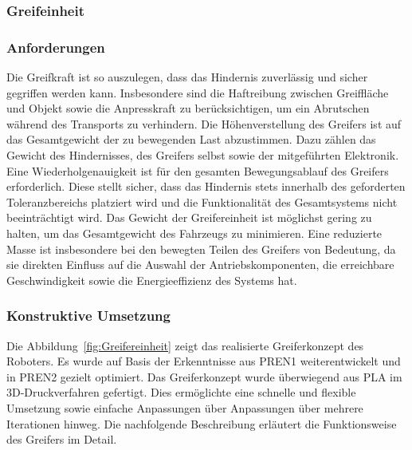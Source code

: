 \documentclass[main.tex]{subfiles} %
\begin{document}

\subsubsection{Greifeinheit}

\subsubsection*{Anforderungen}

Die Greifkraft ist so auszulegen, dass das Hindernis zuverlässig und sicher gegriffen werden kann.
Insbesondere sind die Haftreibung zwischen Greiffläche und Objekt sowie die Anpresskraft zu berücksichtigen,
um ein Abrutschen während des Transports zu verhindern. Die Höhenverstellung des Greifers ist auf das Gesamtgewicht
der zu bewegenden Last abzustimmen. Dazu zählen das Gewicht des Hindernisses, des Greifers selbst sowie der
mitgeführten Elektronik. Eine Wiederholgenauigkeit ist für den gesamten Bewegungsablauf des Greifers erforderlich.
Diese stellt sicher, dass das Hindernis stets innerhalb des geforderten Toleranzbereichs platziert wird und die
Funktionalität des Gesamtsystems nicht beeinträchtigt wird. Das Gewicht der Greifereinheit ist möglichst gering 
zu halten, um das Gesamtgewicht des Fahrzeugs zu minimieren. Eine reduzierte Masse ist insbesondere bei den bewegten
Teilen des Greifers von Bedeutung, da sie direkten Einfluss auf die Auswahl der Antriebskomponenten, die erreichbare
Geschwindigkeit sowie die Energieeffizienz des Systems hat.


\subsubsection*{Konstruktive Umsetzung}

Die Abbildung~\ref{fig:Greifereinheit} zeigt das realisierte Greiferkonzept des Roboters.
Es wurde auf Basis der Erkenntnisse aus PREN1 weiterentwickelt und in PREN2 gezielt optimiert.
Das Greiferkonzept wurde überwiegend aus PLA im 3D-Druckverfahren gefertigt.
Dies ermöglichte eine schnelle und flexible Umsetzung sowie einfache Anpassungen über Anpassungen
über mehrere Iterationen hinweg. Die nachfolgende Beschreibung erläutert die Funktionsweise des Greifers im Detail.
\end{document}
